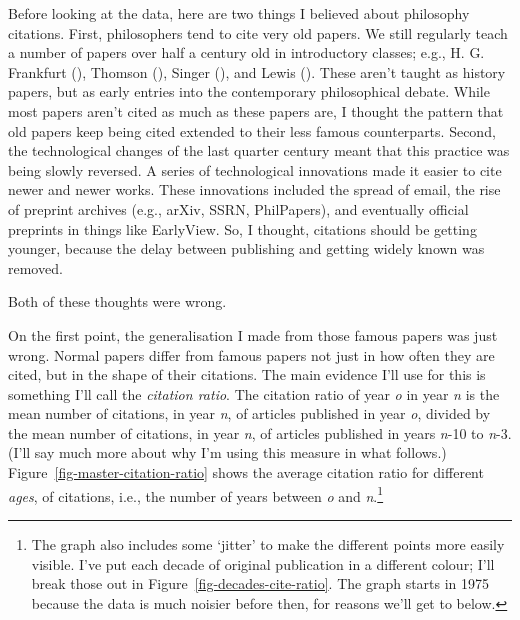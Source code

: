 \documentclass[
  12pt,
  letterpaper,
  DIV=11,
  numbers=noendperiod]{scrartcl}
\begin{document}
Before looking at the data, here are two things I believed about
philosophy citations. First, philosophers tend to cite very old papers.
We still regularly teach a number of papers over half a century old in
introductory classes; e.g., H. G. Frankfurt
(), Thomson
(), Singer
(), and Lewis
(). These aren't taught as history
papers, but as early entries into the contemporary philosophical debate.
While most papers aren't cited as much as these papers are, I thought
the pattern that old papers keep being cited extended to their less
famous counterparts. Second, the technological changes of the last
quarter century meant that this practice was being slowly reversed. A
series of technological innovations made it easier to cite newer and
newer works. These innovations included the spread of email, the rise of
preprint archives (e.g., arXiv, SSRN, PhilPapers), and eventually
official preprints in things like EarlyView. So, I thought, citations
should be getting younger, because the delay between publishing and
getting widely known was removed.

Both of these thoughts were wrong.

On the first point, the generalisation I made from those famous papers
was just wrong. Normal papers differ from famous papers not just in how
often they are cited, but in the shape of their citations. The main
evidence I'll use for this is something I'll call the \emph{citation
ratio}. The citation ratio of year \emph{o} in year \emph{n} is the mean
number of citations, in year \emph{n}, of articles published in year
\emph{o}, divided by the mean number of citations, in year \emph{n}, of
articles published in years \emph{n}-10 to \emph{n}-3. (I'll say much
more about why I'm using this measure in what follows.)
Figure~\ref{fig-master-citation-ratio} shows the average citation ratio
for different \emph{ages}, of citations, i.e., the number of years
between \emph{o} and \emph{n}.\footnote{The graph also includes some
  `jitter' to make the different points more easily visible. I've put
  each decade of original publication in a different colour; I'll break
  those out in Figure~\ref{fig-decades-cite-ratio}. The graph starts in
  1975 because the data is much noisier before then, for reasons we'll
  get to below.}
\end{document}
